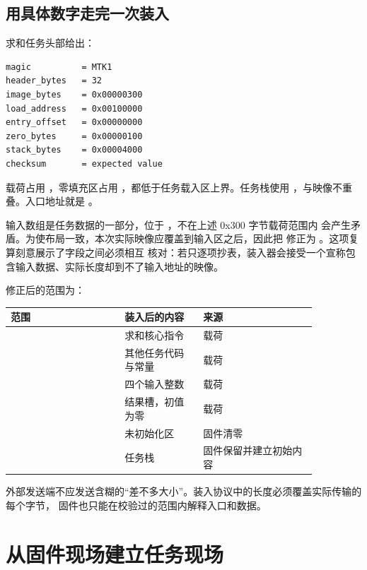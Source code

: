 \subsection{用具体数字走完一次装入}

求和任务头部给出：

\begin{lstlisting}
magic          = MTK1
header_bytes   = 32
image_bytes    = 0x00000300
load_address   = 0x00100000
entry_offset   = 0x00000000
zero_bytes     = 0x00000100
stack_bytes    = 0x00004000
checksum       = expected value
\end{lstlisting}

载荷占用 ，零填充区占用
，都低于任务载入区上界。任务栈使用
，与映像不重叠。入口地址就是
。

输入数组是任务数据的一部分，位于 ，不在上述 0x300 字节载荷范围内
会产生矛盾。为使布局一致，本次实际映像应覆盖到输入区之后，因此把
 修正为 。这项复算刻意展示了字段之间必须相互
核对：若只逐项抄表，装入器会接受一个宣称包含输入数据、实际长度却到不了输入地址的映像。

修正后的范围为：

\begin{longtable}{|L{0.32\linewidth}|L{0.22\linewidth}|L{0.32\linewidth}|}
\hline
{}
范围 & 装入后的内容 & 来源 \\ \hline
{} & 求和核心指令 & 载荷 \\ \hline
{} & 其他任务代码与常量 & 载荷 \\ \hline
{} & 四个输入整数 & 载荷 \\ \hline
{} & 结果槽，初值为零 & 载荷 \\ \hline
{} & 未初始化区 & 固件清零 \\ \hline
{} & 任务栈 & 固件保留并建立初始内容 \\ \hline
\end{longtable}

外部发送端不应发送含糊的“差不多大小”。装入协议中的长度必须覆盖实际传输的每个字节，
固件也只能在校验过的范围内解释入口和数据。

\section{从固件现场建立任务现场}

